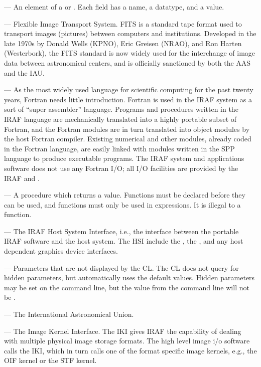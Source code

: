 \medskip \noindent {} --- An element of a  or . Each field has
a name, a datatype, and a value.

\medskip \noindent {} --- Flexible Image Transport System. FITS is
a standard tape format used to transport images (pictures) between computers
and institutions.  Developed in the late 1970s by Donald Wells (KPNO), 
Eric Greisen (NRAO), and Ron Harten (Westerbork),  
the FITS standard is now widely used for the
interchange of image data between astronomical centers, and is officially
sanctioned by both the AAS and the IAU.

\medskip \noindent {} --- As the most widely used language 
for scientific computing for the past
twenty years, Fortran needs little introduction.  Fortran is used in the 
IRAF system as a sort of ``super assembler'' language.  Programs and procedures
written in the IRAF  language are mechanically translated 
into a highly
portable subset of Fortran, and the Fortran modules are in turn translated
into object modules by the host Fortran compiler.  Existing numerical
and other modules, already coded in the Fortran language, are easily linked
with modules written in the SPP language to produce executable programs.
The IRAF system and applications software does not use any Fortran I/O;
all I/O facilities are provided by the IRAF  and
.

\medskip \noindent {} --- A procedure which returns a value.
Functions must be declared before they can be used, and functions must only be
used in expressions. It is illegal to  a function.

\medskip \noindent {} --- The IRAF Host System Interface,
i.e., the interface between the portable IRAF software and the host system.
The HSI include the , the ,
and any host dependent graphics device interfaces.

\medskip \noindent {} --- Parameters that
are not displayed by the CL.
The CL does not query for hidden parameters, but automatically
uses the default values.  Hidden parameters may be set on the command line,
but the value from the command line will not be .

\medskip \noindent {} --- The International Astronomical Union.

\medskip \noindent {} --- The Image Kernel Interface.  The IKI
gives IRAF the capability of dealing with multiple physical image storage
formats.  The high level image i/o software calls the IKI, which in turn
calls one of the format specific image kernels, e.g., the OIF kernel or
the STF kernel.

